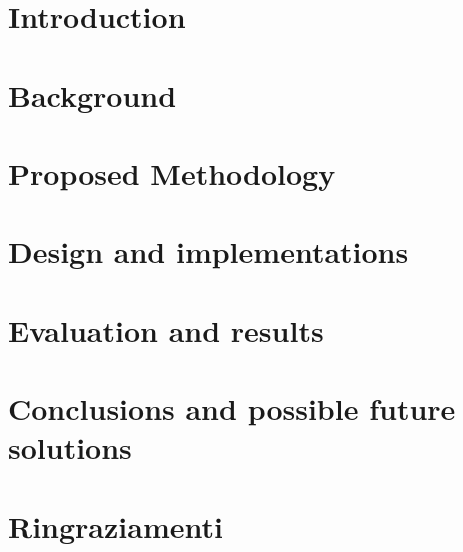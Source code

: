 \documentclass[
12pt, %
oneside, %
english, %
onehalfspacing,
liststotoc, %
headsepline, %
]{MastersDoctoralThesis} %
\begin{document}
\mainmatter %

\pagestyle{thesis} %

%

\chapter{Introduction}
\label{cap:introduzione}


\chapter{Background}
\label{cap:stato_dellarte}


\chapter{Proposed Methodology}
\label{cap:metodologia}


\chapter{Design and implementations}
\label{cap:progettazione}


\chapter{Evaluation and results}
\label{cap:sperimentazione}


\chapter{Conclusions and possible future solutions}
\label{cap:conclusioni}


\chapter*{Ringraziamenti}
\thispagestyle{empty}
\end{document}
